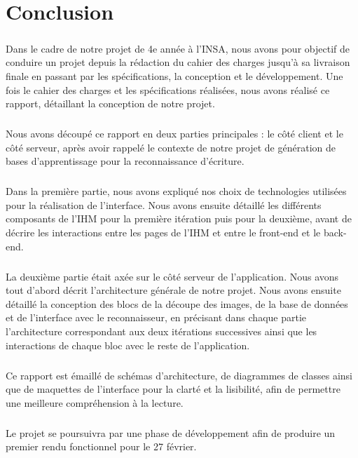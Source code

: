 \chapter{Conclusion}

\paragraph{}
Dans le cadre de notre projet de 4e année à l’INSA, nous avons pour objectif de conduire un projet depuis la rédaction du cahier des charges jusqu’à sa livraison finale en passant par les spécifications, la conception et le développement. Une fois le cahier des charges et les spécifications réalisées, nous avons réalisé ce rapport, détaillant la conception de notre projet.

\paragraph{}
Nous avons découpé ce rapport en deux parties principales : le côté client et le côté serveur, après avoir rappelé le contexte de notre projet de génération de bases d’apprentissage pour la reconnaissance d’écriture.

\paragraph{}
Dans la première partie, nous avons expliqué nos choix de technologies utilisées pour la réalisation de l’interface. Nous avons ensuite détaillé les différents composants de l’IHM pour la première itération puis pour la deuxième, avant de décrire les interactions entre les pages de l’IHM et entre le front-end et le back-end.

\paragraph{}
La deuxième partie était axée sur le côté serveur de l’application. Nous avons tout d’abord décrit l’architecture générale de notre projet. Nous avons ensuite détaillé la conception des blocs de la découpe des images, de la base de données et de l’interface avec le reconnaisseur, en précisant dans chaque partie l’architecture correspondant aux deux itérations successives ainsi que les interactions de chaque bloc avec le reste de l’application.

\paragraph{}
Ce rapport est émaillé de schémas d’architecture, de diagrammes de classes ainsi que de maquettes de l’interface pour la clarté et la lisibilité, afin de permettre une meilleure compréhension à la lecture.

\paragraph{}
Le projet se poursuivra par une phase de développement afin de produire un premier rendu fonctionnel pour le 27 février.
